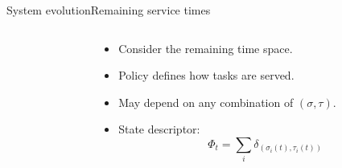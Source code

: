 \documentclass[aspectratio=169]{beamer}
\begin{document}
\begin{frame}{System evolution}{Remaining service times}
\begin{columns}
\begin{column}{0.45\textwidth}
	\end{column}
	\begin{column}{0.55\textwidth}
		\begin{itemize}
			\item<1-> Consider the remaining time space.
			\item<3-> \alert{Policy} defines how tasks are served.
			\item<3-> May depend on any combination of $(\sigma,\tau)$.
			\item<5-> State descriptor:
			 \begin{equation*}
				\Phi_t = \sum_i \delta_{\left(\sigma_i(t),\tau_i(t)\right)}
			 \end{equation*}
		\end{itemize}
	\end{column}
	\end{columns}

\end{frame}
\end{document}
